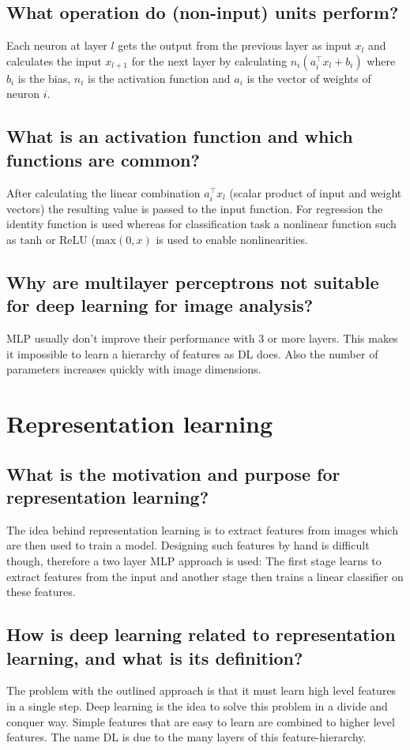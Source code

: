 \subsection{What operation do (non-input) units perform?}
Each neuron at layer $l$ gets the output from the previous layer as input $x_l$ and calculates the input $x_{l+1}$ for the next layer by calculating $n_i(a_i^\top x_l + b_i)$ where $b_i$ is the bias, $n_i$ is the activation function and $a_i$ is the vector of weights of neuron $i$.
\subsection{What is an activation function and which functions are common?}
After calculating the linear combination $a_i^\top x_l$ (scalar product of input and weight vectors) the resulting value is passed to the input function. For regression the identity function is 	used whereas for classification task a nonlinear function such as $\mathrm{tanh}$ or ReLU ($\mathrm{max}(0,x)$ is used to enable nonlinearities.
\subsection{Why are multilayer perceptrons not suitable for deep learning for image analysis?}
MLP usually don't improve their performance with 3 or more layers. This makes it impossible to learn a hierarchy of features as DL does.
Also the number of parameters increases quickly with image dimensions.
%
\section{Representation learning}
\subsection{What is the motivation and purpose for representation learning?}
The idea behind representation learning is to extract features from images which are then used to train a model. Designing such features by hand is difficult though, therefore a two layer MLP approach is used: The first stage learns to extract features from the input and another stage then trains a linear classifier on these features.
\subsection{How is deep learning related to representation learning, and what is its definition?}
The problem with the outlined approach is that it must learn high level features in a single step. Deep learning is the idea to solve this problem in a divide and conquer way. 
Simple features that are easy to learn are combined to higher level features. The name DL is due to the many layers of this feature-hierarchy.
%
